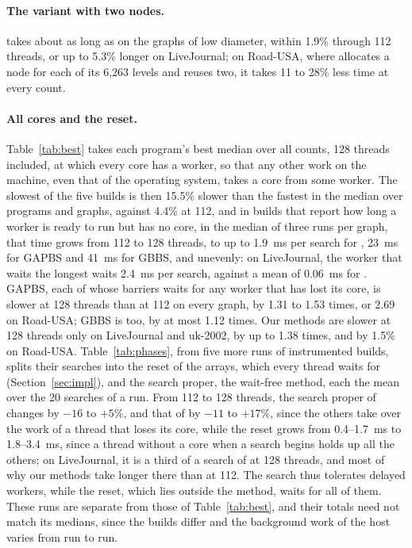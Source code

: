 \paragraph{The variant with two nodes.} \wfdomem takes about as long as \wfdo on the graphs of low diameter, within 1.9\% through 112 threads, or up to 5.3\% longer on LiveJournal; on Road-USA, where \wfdo allocates a node for each of its 6,263 levels and \wfdomem reuses two, it takes 11 to 28\% less time at every count.

\paragraph{All cores and the reset.} Table~\ref{tab:best} takes each program's best median over all counts, 128 threads included, at which every core has a worker, so that any other work on the machine, even that of the operating system, takes a core from some worker. The slowest of the five builds is then 15.5\% slower than the fastest in the median over programs and graphs, against 4.4\% at 112, and in builds that report how long a worker is ready to run but has no core, in the median of three runs per graph, that time grows from 112 to 128 threads, to up to 1.9~ms per search for \wfdo, 23~ms for GAPBS and 41~ms for GBBS, and unevenly: on LiveJournal, the worker that waits the longest waits 2.4~ms per search, against a mean of 0.06~ms for \wfdo. GAPBS, each of whose barriers waits for any worker that has lost its core, is slower at 128 threads than at 112 on every graph, by 1.31 to 1.53 times, or 2.69 on Road-USA; GBBS is too, by at most 1.12 times. Our methods are slower at 128 threads only on LiveJournal and uk-2002, by up to 1.38 times, and \wfdo by 1.5\% on Road-USA. Table~\ref{tab:phases}, from five more runs of instrumented builds, splits their searches into the reset of the arrays, which every thread waits for (Section~\ref{sec:impl}), and the search proper, the wait-free method, each the mean over the 20 searches of a run. From 112 to 128 threads, the search proper of \wfdo changes by $-16$ to $+5$\%, and that of \wfdomem by $-11$ to $+17$\%, since the others take over the work of a thread that loses its core, while the reset grows from 0.4--1.7~ms to 1.8--3.4~ms, since a thread without a core when a search begins holds up all the others; on LiveJournal, it is a third of a search of \wfdo at 128 threads, and most of why our methods take longer there than at 112. The search thus tolerates delayed workers, while the reset, which lies outside the method, waits for all of them. These runs are separate from those of Table~\ref{tab:best}, and their totals need not match its medians, since the builds differ and the background work of the host varies from run to run.

